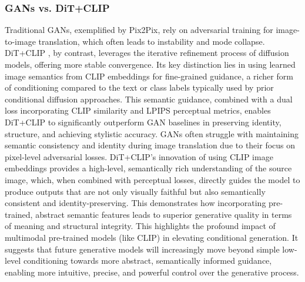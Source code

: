 \documentclass[a4paper]{article}
\begin{document}
\subsubsection*{GANs vs. DiT+CLIP}
Traditional GANs, exemplified by Pix2Pix, rely on adversarial training for image-to-image translation, which often leads to instability and mode collapse. DiT+CLIP \cite{Zhu2025ImageToImage}, by contrast, leverages the iterative refinement process of diffusion models, offering more stable convergence. Its key distinction lies in using learned image semantics from CLIP embeddings for fine-grained guidance, a richer form of conditioning compared to the text or class labels typically used by prior conditional diffusion approaches. This semantic guidance, combined with a dual loss incorporating CLIP similarity and LPIPS perceptual metrics, enables DiT+CLIP to significantly outperform GAN baselines in preserving identity, structure, and achieving stylistic accuracy. GANs often struggle with maintaining semantic consistency and identity during image translation due to their focus on pixel-level adversarial losses. DiT+CLIP's innovation of using CLIP image embeddings provides a high-level, semantically rich understanding of the source image, which, when combined with perceptual losses, directly guides the model to produce outputs that are not only visually faithful but also semantically consistent and identity-preserving. This demonstrates how incorporating pre-trained, abstract semantic features leads to superior generative quality in terms of meaning and structural integrity. This highlights the profound impact of multimodal pre-trained models (like CLIP) in elevating conditional generation. It suggests that future generative models will increasingly move beyond simple low-level conditioning towards more abstract, semantically informed guidance, enabling more intuitive, precise, and powerful control over the generative process.
\end{document}
